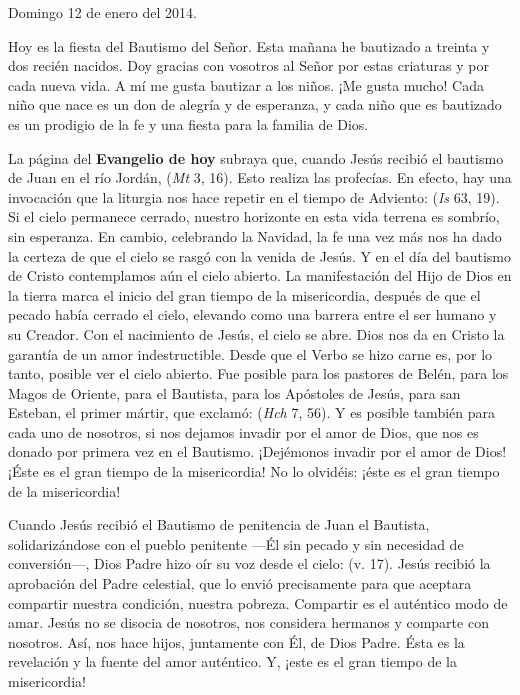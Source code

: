 {Domingo 12 de enero del 2014.

Hoy es la fiesta del Bautismo del Señor. Esta mañana he bautizado a treinta y dos recién nacidos. Doy gracias con vosotros al Señor por estas criaturas y por cada nueva vida. A mí me gusta bautizar a los niños. ¡Me gusta mucho! Cada niño que nace es un don de alegría y de esperanza, y cada niño que es bautizado es un prodigio de la fe y una fiesta para la familia de Dios.

La página del \textbf{Evangelio de hoy} subraya que, cuando Jesús recibió el bautismo de Juan en el río Jordán,  (\emph{Mt} 3, 16). Esto realiza las profecías. En efecto, hay una invocación que la liturgia nos hace repetir en el tiempo de Adviento:  (\emph{Is} 63, 19). Si el cielo permanece cerrado, nuestro horizonte en esta vida terrena es sombrío, sin esperanza. En cambio, celebrando la Navidad, la fe una vez más nos ha dado la certeza de que el cielo se rasgó con la venida de Jesús. Y en el día del bautismo de Cristo contemplamos aún el cielo abierto. La manifestación del Hijo de Dios en la tierra marca el inicio del gran tiempo de la misericordia, después de que el pecado había cerrado el cielo, elevando como una barrera entre el ser humano y su Creador. Con el nacimiento de Jesús, el cielo se abre. Dios nos da en Cristo la garantía de un amor indestructible. Desde que el Verbo se hizo carne es, por lo tanto, posible ver el cielo abierto. Fue posible para los pastores de Belén, para los Magos de Oriente, para el Bautista, para los Apóstoles de Jesús, para san Esteban, el primer mártir, que exclamó:  (\emph{Hch} 7, 56). Y es posible también para cada uno de nosotros, si nos dejamos invadir por el amor de Dios, que nos es donado por primera vez en el Bautismo. ¡Dejémonos invadir por el amor de Dios! ¡Éste es el gran tiempo de la misericordia! No lo olvidéis: ¡éste es el gran tiempo de la misericordia!

Cuando Jesús recibió el Bautismo de penitencia de Juan el Bautista, solidarizándose con el pueblo penitente ---Él sin pecado y sin necesidad de conversión---, Dios Padre hizo oír su voz desde el cielo:  (v. 17). Jesús recibió la aprobación del Padre celestial, que lo envió precisamente para que aceptara compartir nuestra condición, nuestra pobreza. Compartir es el auténtico modo de amar. Jesús no se disocia de nosotros, nos considera hermanos y comparte con nosotros. Así, nos hace hijos, juntamente con Él, de Dios Padre. Ésta es la revelación y la fuente del amor auténtico. Y, ¡este es el gran tiempo de la misericordia!

}
